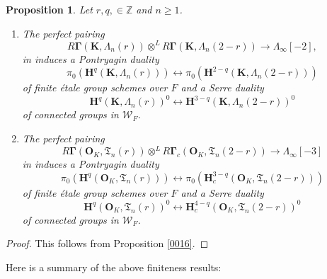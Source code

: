 \documentclass{amsart}
\newtheorem{Prop}[Thm]{Proposition}
\theoremstyle{remark}
\numberwithin{equation}{section}
\newcommand{\tensor}{\mathbin{\otimes}}
\newcommand{\Z}{\mathbb{Z}}
\newcommand{\alg}[1]{\mathbf{#1}}
\begin{document}
\begin{Prop} \label{0092}
	Let $r, q, \in \Z$ and $n \ge 1$.
	\begin{enumerate}
		\item
			The perfect pairing
				\[
							R \alg{\Gamma}(\alg{K}, \Lambda_{n}(r))
						\tensor^{L}
							R \alg{\Gamma}(\alg{K}, \Lambda_{n}(2 - r))
					\to
						\Lambda_{\infty}[-2],
				\]
			in \cite[Proposition 6.2.2]{Suz24} induces a Pontryagin duality
				\[
						\pi_{0}(\alg{H}^{q}(\alg{K}, \Lambda_{n}(r)))
					\leftrightarrow
						\pi_{0}(\alg{H}^{2 - q}(\alg{K}, \Lambda_{n}(2 - r)))
				\]
			of finite \'etale group schemes over $F$ and a Serre duality
				\[
						\alg{H}^{q}(\alg{K}, \Lambda_{n}(r))^{0}
					\leftrightarrow
						\alg{H}^{3 - q}(\alg{K}, \Lambda_{n}(2 - r))^{0}
				\]
			of connected groups in $\mathcal{W}_{F}$.
		\item
			The perfect pairing
				\[
							R \alg{\Gamma}(\alg{O}_{K}, \mathfrak{T}_{n}(r))
						\tensor^{L}
							R \alg{\Gamma}_{c}(\alg{O}_{K}, \mathfrak{T}_{n}(2 - r))
					\to
						\Lambda_{\infty}[-3]
				\]
			in \cite[Proposition 6.5.1]{Suz24} induces a Pontryagin duality
				\[
						\pi_{0}(\alg{H}^{q}(\alg{O}_{K}, \mathfrak{T}_{n}(r)))
					\leftrightarrow
						\pi_{0}(\alg{H}^{3 - q}_{c}(\alg{O}_{K}, \mathfrak{T}_{n}(2 - r)))
				\]
			of finite \'etale group schemes over $F$ and a Serre duality
				\[
						\alg{H}^{q}(\alg{O}_{K}, \mathfrak{T}_{n}(r))^{0}
					\leftrightarrow
						\alg{H}^{4 - q}_{c}(\alg{O}_{K}, \mathfrak{T}_{n}(2 - r))^{0}
				\]
			of connected groups in $\mathcal{W}_{F}$.
	\end{enumerate}
\end{Prop}

\begin{proof}
	This follows from Proposition \ref{0016}.
\end{proof}

Here is a summary of the above finiteness results:
\end{document}
